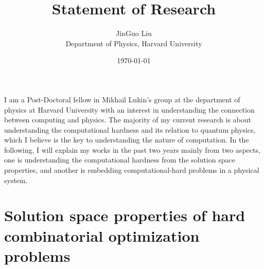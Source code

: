 \documentclass[a4paper]{article}
\title{Statement of Research}
\author{JinGuo Liu\\ Department of Physics, Harvard University}
\date{\today}
\newcommand{\<}{\langle}
\renewcommand{\>}{\rangle}
\begin{document}
\fontsize{10}{13}
\selectfont
\maketitle

I am a Post-Doctoral fellow in Mikhail Lukin's group at the department of physics at Harvard University with an interest in understanding the connection between computing and physics.
The majority of my current research is about understanding the computational hardness and its relation to quantum physics, which I believe is the key to understanding the nature of computation.
In the following, I will explain my works in the past two years mainly from two aspects, one is understanding the computational hardness from the solution space properties, and another is embedding computational-hard problems in a physical system.

\section{Solution space properties of hard combinatorial optimization problems}
\end{document}
